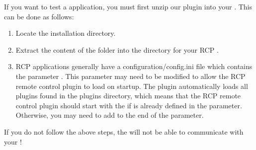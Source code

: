 
If you want to test a  application, you
must first unzip our  plugin into your
\gdaut{}. This can be done as follows:

\begin{enumerate}
\item Locate the  \app{} installation directory.
\item Extract the content of the  folder into the  directory for your RCP \gdaut{}.
\item RCP applications generally have a configuration/config.ini file which contains the parameter . This parameter may need to be modified to allow the RCP remote control plugin to load on \gdaut{} startup. The  plugin automatically loads all plugins found in the plugins directory, which means that the RCP remote control plugin should start with the \gdaut{} if  is already defined in the  parameter. Otherwise, you may need to add   to the end of the  parameter.
\end{enumerate}

If you do not follow the above steps, the \gdagent{} will not be able to
communicate with your \gdaut{}!


